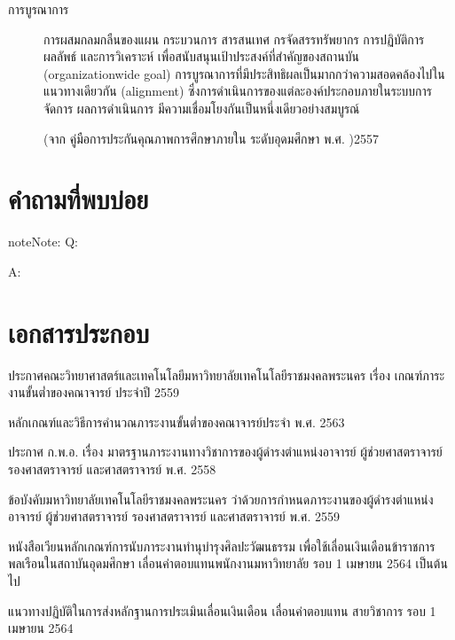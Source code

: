 \documentclass[a4paper,12pt,english]{sphinxmanual}
\begin{document}
\begin{description}
\item[{การบูรณาการ\label{\detokenize{glossary:term-11}}}] \leavevmode
การผสมกลมกลืนของแผน กระบวนการ สารสนเทศ กรจัดสรรทรัพยากร การปฏิบัติการ ผลลัพธ์ และการวิเคราะห์ เพื่อสนับสนุนเป้าประสงค์ที่สำคัญของสถานบัน (organization\sphinxhyphen{}wide goal) การบูรณาการที่มีประสิทธิผลเป็นมากกว่าความสอดคล้องไปในแนวทางเดียวกัน (alignment) ซึ่งการดำเนินการของแต่ละองค์ประกอบภายในระบบการจัดการ ผลการดำเนินการ มีความเชื่อมโยงกันเป็นหนึ่งเดียวอย่างสมบูรณ์

(จาก คู่มือการประกันคุณภาพการศึกษาภายใน ระดับอุดมศึกษา พ.ศ. )2557

\end{description}


\chapter{คำถามที่พบบ่อย}
\label{\detokenize{faq:id1}}\label{\detokenize{faq::doc}}
\begin{sphinxadmonition}{note}{Note:}
Q:

A:
\end{sphinxadmonition}


\chapter{เอกสารประกอบ}
\label{\detokenize{official_documents:id1}}\label{\detokenize{official_documents::doc}}
 ประกาศคณะวิทยาศาสตร์และเทคโนโลยีมหาวิทยาลัยเทคโนโลยีราชมงคลพระนคร เรื่อง เกณฑ์ภาระงานขั้นต่ำของคณาจารย์ ประจำปี 2559

 หลักเกณฑ์และวิธีการคำนวณภาระงานขั้นต่ำของคณาจารย์ประจำ พ.ศ. 2563

 ประกาศ ก.พ.อ. เรื่อง มาตรฐานภาระงานทางวิชาการของผู้ดำรงตำแหน่งอาจารย์ ผู้ช่วยศาสตราจารย์ รองศาสตราจารย์ และศาสตราจารย์ พ.ศ. 2558

 ข้อบังคับมหาวิทยาลัยเทคโนโลยีราชมงคลพระนคร ว่าด้วยการกำหนดภาระงานของผู้ดำรงตำแหน่งอาจารย์ ผู้ช่วยศาสตราจารย์ รองศาสตราจารย์ และศาสตราจารย์ พ.ศ. 2559

 หนังสือเวียนหลักเกณฑ์การนับภาระงานทำนุบำรุงศิลปะวัฒนธรรม เพื่อใช้เลื่อนเงินเดือนข้าราชการพลเรือนในสถาบันอุดมศึกษา เลื่อนค่าตอบแทนพนักงานมหาวิทยาลัย รอบ 1 เมษายน 2564 เป็นต้นไป

 แนวทางปฏิบัติในการส่งหลักฐานการประเมินเลื่อนเงินเดือน เลื่อนค่าตอบแทน สายวิชาการ รอบ 1 เมษายน 2564
\end{document}
